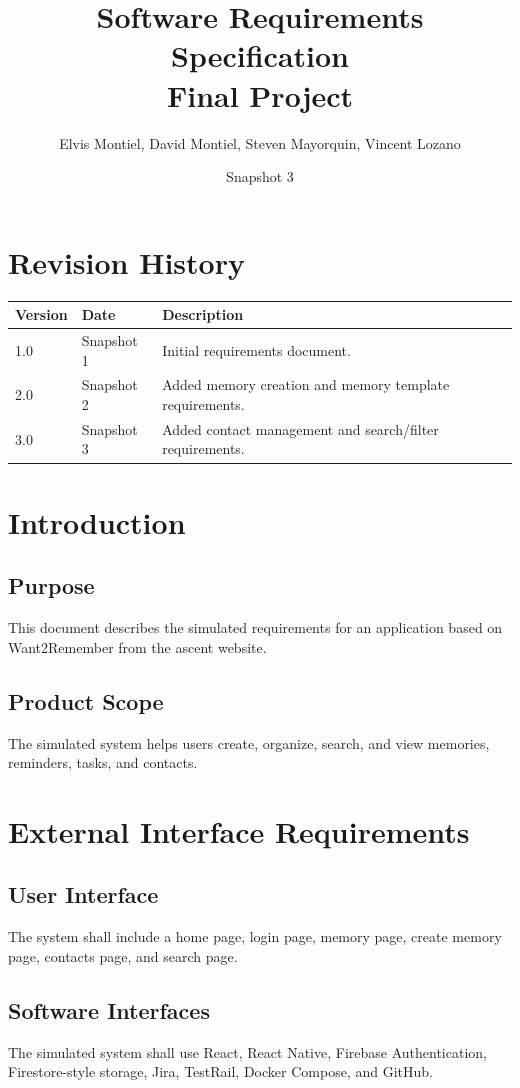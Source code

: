 \documentclass{article}
\title{Software Requirements Specification\\Final Project}
\author{Elvis Montiel, David Montiel, Steven Mayorquin, Vincent Lozano}
\date{Snapshot 3}
\begin{document}
\maketitle
\tableofcontents
\newpage

\section{Revision History}
\begin{longtable}{|p{2cm}|p{3cm}|p{8cm}|}
\hline
Version & Date & Description \\ \hline
1.0 & Snapshot 1 & Initial requirements document. \\ \hline
2.0 & Snapshot 2 & Added memory creation and memory template requirements. \\ \hline
3.0 & Snapshot 3 & Added contact management and search/filter requirements. \\ \hline
\end{longtable}

\section{Introduction}
\subsection{Purpose}
This document describes the simulated requirements for an application based on Want2Remember from the ascent website.

\subsection{Product Scope}
The simulated system helps users create, organize, search, and view memories, reminders, tasks, and contacts.

\section{External Interface Requirements}
\subsection{User Interface}
The system shall include a home page, login page, memory page, create memory page, contacts page, and search page.

\subsection{Software Interfaces}
The simulated system shall use React, React Native, Firebase Authentication, Firestore-style storage, Jira, TestRail, Docker Compose, and GitHub.
\end{document}
